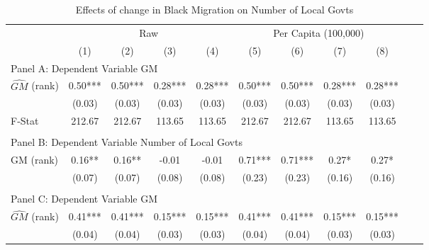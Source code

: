  \begin{table}[htbp]\centering {} \begin{threeparttable} \caption{Effects of change in Black Migration on Number of Local Govts} \begin{tabular}{l*{10}{c}} \toprule
                &\multicolumn{4}{c}{Raw}                                    &\multicolumn{4}{c}{Per Capita (100,000)}                   \\\cmidrule(lr){2-5}\cmidrule(lr){6-9}
                &\multicolumn{1}{c}{(1)}   &\multicolumn{1}{c}{(2)}   &\multicolumn{1}{c}{(3)}   &\multicolumn{1}{c}{(4)}   &\multicolumn{1}{c}{(5)}   &\multicolumn{1}{c}{(6)}   &\multicolumn{1}{c}{(7)}   &\multicolumn{1}{c}{(8)}   \\
\cmidrule(lr){1-9}
\multicolumn{8}{l}{Panel A: Dependent Variable GM}\\
\cmidrule(lr){1-9}
$\hat{GM}$ (rank)&       0.50***&       0.50***&       0.28***&       0.28***&       0.50***&       0.50***&       0.28***&       0.28***\\
                &     (0.03)   &     (0.03)   &     (0.03)   &     (0.03)   &     (0.03)   &     (0.03)   &     (0.03)   &     (0.03)   \\
\midrule
F-Stat          &     212.67   &     212.67   &     113.65   &     113.65   &     212.67   &     212.67   &     113.65   &     113.65   \\
\cmidrule[\heavyrulewidth](lr){1-9} \\ \cmidrule[\heavyrulewidth](lr){1-9}
\multicolumn{8}{l}{Panel B: Dependent Variable Number of Local Govts}\\
\cmidrule(lr){1-9}
GM  (rank)      &       0.16** &       0.16** &      -0.01   &      -0.01   &       0.71***&       0.71***&       0.27*  &       0.27*  \\
                &     (0.07)   &     (0.07)   &     (0.08)   &     (0.08)   &     (0.23)   &     (0.23)   &     (0.16)   &     (0.16)   \\
\cmidrule[\heavyrulewidth](lr){1-9} \\ \cmidrule[\heavyrulewidth](lr){1-9}
\multicolumn{8}{l}{Panel C: Dependent Variable GM}\\
\cmidrule(lr){1-9}
$\hat{GM}$ (rank)&       0.41***&       0.41***&       0.15***&       0.15***&       0.41***&       0.41***&       0.15***&       0.15***\\
                &     (0.04)   &     (0.04)   &     (0.03)   &     (0.03)   &     (0.04)   &     (0.04)   &     (0.03)   &     (0.03)   \\

\end{tabular}
\end{threeparttable}
\end{table}
